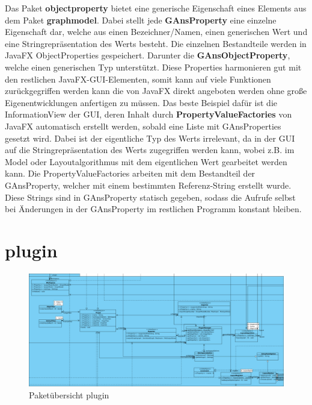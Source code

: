 Das Paket \textbf{objectproperty} bietet eine generische Eigenschaft eines Elements aus dem Paket \textbf{graphmodel}. Dabei stellt jede \textbf{GAnsProperty} eine einzelne Eigenschaft dar, welche aus einen Bezeichner/Namen, einen generischen Wert und eine Stringrepräsentation des Werts besteht. Die einzelnen Bestandteile werden in JavaFX ObjectProperties gespeichert. Darunter die \textbf{GAnsObjectProperty}, welche einen generischen Typ unterstützt. Diese Properties harmonieren gut mit den restlichen JavaFX-GUI-Elementen, somit kann auf viele Funktionen zurückgegriffen werden kann die von JavaFX direkt angeboten werden ohne große Eigenentwicklungen anfertigen zu müssen. Das beste Beispiel dafür ist die InformationView der GUI, deren Inhalt durch \textbf{PropertyValueFactories} von JavaFX automatisch erstellt werden, sobald eine Liste mit GAnsProperties gesetzt wird. Dabei ist der eigentliche Typ des Werts irrelevant, da in der GUI auf die Stringrepräsentation des Werts zugegriffen werden kann, wobei z.B. im Model oder Layoutalgorithmus mit dem eigentlichen Wert gearbeitet werden kann. Die PropertyValueFactories arbeiten mit dem Bestandteil der GAnsProperty, welcher mit einem bestimmten Referenz-String erstellt wurde. Diese Strings sind in GAnsProperty statisch gegeben, sodass die Aufrufe selbst bei Änderungen in der GAnsProperty im restlichen Programm konstant bleiben.

\newpage

\section{plugin}

\begin{figure}[hb]
  \centering
  \includegraphics[width=380pt]{resourcen/plugin.png}
  \caption{Paketübersicht plugin}
  \label{fig:packge_plugin}
\end{figure}

